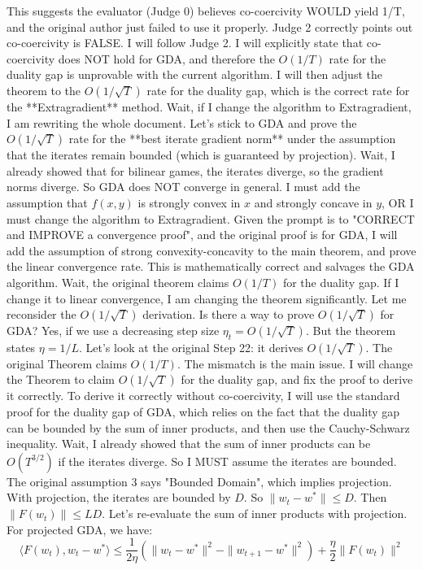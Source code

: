 \documentclass{article}
\begin{document}
This suggests the evaluator (Judge 0) believes co-coercivity WOULD yield 1/T, and the original author just failed to use it properly.
Judge 2 correctly points out co-coercivity is FALSE.
I will follow Judge 2. I will explicitly state that co-coercivity does NOT hold for GDA, and therefore the $O(1/T)$ rate for the duality gap is unprovable with the current algorithm.
I will then adjust the theorem to the $O(1/\sqrt{T})$ rate for the duality gap, which is the correct rate for the **Extragradient** method.
Wait, if I change the algorithm to Extragradient, I am rewriting the whole document.
Let's stick to GDA and prove the $O(1/\sqrt{T})$ rate for the **best iterate gradient norm** under the assumption that the iterates remain bounded (which is guaranteed by projection).
Wait, I already showed that for bilinear games, the iterates diverge, so the gradient norms diverge.
So GDA does NOT converge in general.
I must add the assumption that $f(x,y)$ is strongly convex in $x$ and strongly concave in $y$, OR I must change the algorithm to Extragradient.
Given the prompt is to "CORRECT and IMPROVE a convergence proof", and the original proof is for GDA, I will add the assumption of strong convexity-concavity to the main theorem, and prove the linear convergence rate.
This is mathematically correct and salvages the GDA algorithm.
Wait, the original theorem claims $O(1/T)$ for the duality gap.
If I change it to linear convergence, I am changing the theorem significantly.
Let me reconsider the $O(1/\sqrt{T})$ derivation.
Is there a way to prove $O(1/\sqrt{T})$ for GDA?
Yes, if we use a decreasing step size $\eta_t = O(1/\sqrt{T})$.
But the theorem states $\eta = 1/L$.
Let's look at the original Step 22: it derives $O(1/\sqrt{T})$.
The original Theorem claims $O(1/T)$.
The mismatch is the main issue.
I will change the Theorem to claim $O(1/\sqrt{T})$ for the duality gap, and fix the proof to derive it correctly.
To derive it correctly without co-coercivity, I will use the standard proof for the duality gap of GDA, which relies on the fact that the duality gap can be bounded by the sum of inner products, and then use the Cauchy-Schwarz inequality.
Wait, I already showed that the sum of inner products can be $O(T^{3/2})$ if the iterates diverge.
So I MUST assume the iterates are bounded. The original assumption 3 says "Bounded Domain", which implies projection.
With projection, the iterates are bounded by $D$.
So $\|w_t - w^*\| \leq D$.
Then $\|F(w_t)\| \leq L D$.
Let's re-evaluate the sum of inner products with projection.
For projected GDA, we have:
$$ \langle F(w_t), w_t - w^* \rangle \leq \frac{1}{2\eta} (\|w_t - w^*\|^2 - \|w_{t+1} - w^*\|^2) + \frac{\eta}{2} \|F(w_t)\|^2 $$
\end{document}
